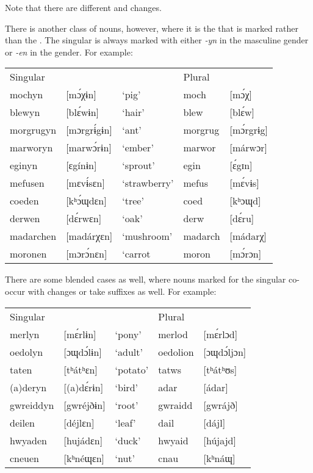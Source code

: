 \documentclass[output=paper,
modfonts
]{LSP/langsci}
\begin{document}
\noindent Note that there are different  and  changes.

There is another class of nouns, however, where it is the  that is marked rather than the . The singular is always marked with either \emph{-yn} in the masculine gender or \emph{-en} in the  gender. For example:

\ea
\begin{tabular}[t]{lllll}
Singular  &             &              & Plural \\
mochyn    & [mɔ́χɨn]     & `pig'        & moch    & [mɔ́χ] \\
blewyn    & [blɛ́wɨn]    & `hair'       & blew    & [blɛ́w] \\
morgrugyn & [mɔrgrɨ́gɨn] & `ant'        & morgrug & [mɔ́rgrɨg] \\
marworyn  & [marwɔ́rɨn]  & `ember'      & marwor  & [márwɔr] \\
eginyn    & [ɛgínɨn]    & `sprout'     & egin    & [ɛ́gɪn] \\
mefusen   & [mɛvɨ́sɛn]   & `strawberry' & mefus   & [mɛ́vɨs] \\
coeden    & [kʰɔ́ɰdɛn]   & `tree'       & coed    & [kʰɔɰd] \\
derwen    & [dɛ́rwɛn]    & `oak'        & derw    & [dɛ́ru] \\
madarchen & [madárχɛn]  & `mushroom'   & madarch & [mádarχ] \\
moronen   & [mɔrɔ́nɛn]   & `carrot      & moron   & [mɔ́rɔn] \\
\end{tabular}
\z

There are some blended cases as well, where nouns marked for the singular co-occur with  changes or take  suffixes as well. For example:

\ea
\begin{tabular}[t]{lllll}
Singular  &            &          & Plural \\
merlyn    & [mɛ́rlɨn]   & `pony'   & merlod   & [mɛ́rlɔd] \\
oedolyn   & [ɔɰdɔ́lɨn]  & `adult'  & oedolion & [ɔɰdɔ́ljɔn] \\
taten     & [tʰátʰɛn]  & `potato' & tatws    & [tʰátʰʊs] \\
(a)deryn  & [(a)dɛ́rɨn] & `bird'   & adar     & [ádar] \\
gwreiddyn & [gwréjðɨn] & `root'   & gwraidd  & [gwrájð] \\
deilen    & [déjlɛn]   & `leaf'   & dail     & [dájl] \\
hwyaden   & [hujádɛn]  & `duck'   & hwyaid   & [hújajd] \\
cneuen    & [kʰnéɰɛn]  & `nut'    & cnau     & [kʰnáɰ]
\end{tabular}
\z
\end{document}
